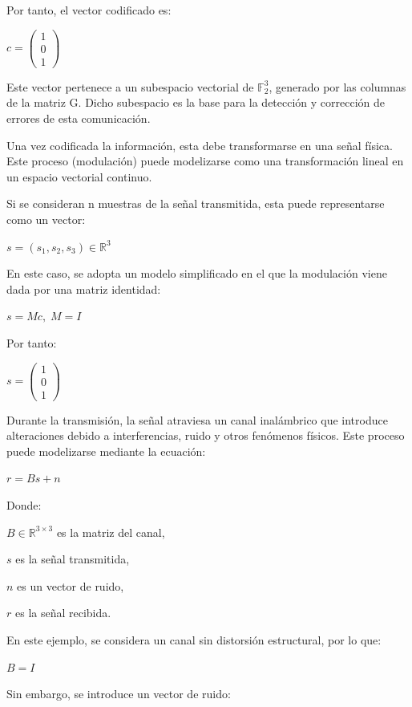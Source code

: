 \documentclass[letterpaper,12pt]{article}
\begin{document}
Por tanto, el vector codificado es:

\centerline{$c = \begin{pmatrix}1 \\ 0 \\ 1\end{pmatrix}$}

Este vector pertenece a un subespacio vectorial de $\mathbb{F}_2^3$, generado por las columnas de la
matriz G. Dicho subespacio es la base para la detección y corrección de errores de esta
comunicación.

Una vez codificada la información, esta debe transformarse en una señal física. Este
proceso (modulación) puede modelizarse como una transformación lineal en un espacio
vectorial continuo.

Si se consideran n muestras de la señal transmitida, esta puede representarse como un
vector:

\centerline{$s=(s_1,s_2,s_3)\in\mathbb{R}^3$}

En este caso, se adopta un modelo simplificado en el que la modulación viene dada por una
matriz identidad:

\centerline{$s=Mc,\; M=I$}

Por tanto:



\centerline{$s = \begin{pmatrix}1 \\ 0 \\ 1\end{pmatrix}$}



Durante la transmisión, la señal atraviesa un canal inalámbrico que introduce alteraciones
debido a interferencias, ruido y otros fenómenos físicos. Este proceso puede modelizarse
mediante la ecuación:

\centerline{$r = Bs + n$}

Donde:

$B\in\mathbb{R}^{3\times 3}$ es la matriz del canal,

$s$ es la señal transmitida,

$n$ es un vector de ruido,

$r$ es la señal recibida.

En este ejemplo, se considera un canal sin distorsión estructural, por lo que:

\centerline{$B=I$}

Sin embargo, se introduce un vector de ruido:
\end{document}
